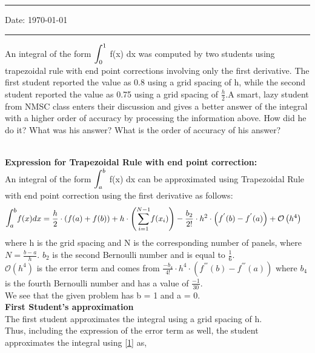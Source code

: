 \documentclass[letterpaper]{exam}
\begin{document}
\hrule
\vspace{3mm}
\noindent 
\vspace{3mm}

\noindent
{{\sf Date: \today }} %
\vspace{3mm}
\hrule
\begin{questions}
\question [3] An integral of the form $\mathlarger{\mathlarger{\int}}_0^1$ f(x) dx was computed by two students using trapezoidal rule with end point corrections involving only the first derivative. The first student reported the value as 0.8 using a grid spacing of h, while the second student reported the value as 0.75 using a grid spacing of $\frac{h}{2}$.A smart, lazy student from NMSC class enters their discussion and gives a better answer of the integral with a higher
order of accuracy by processing the information above. How did he do it? What was his answer? What is the order of accuracy of his answer?
\begin{solution}
\\
\textbf{Expression for Trapezoidal Rule with end point correction:}\\
An integral of the form $\mathlarger{\mathlarger{\int}}_a^b$ f(x) dx can be approximated using Trapezoidal Rule with end point correction using the first derivative as follows:
\begin{align}\label{1}
\mathlarger{\mathlarger{\int}}_a^b f(x) dx &= \frac{h}{2}\cdot\left(f(a) + f(b)\right) + h \cdot \left(\overset{N-1}{\underset{i=1}{\sum}} f(x_i)\right) - \frac{b_2}{2!}\cdot h^2 \cdot \left(f^{'}(b) - f^{'}(a)\right) + \mathcal{O}\left(h^4\right)
\end{align}
where h is the grid spacing and N is the corresponding number of panels, where $N = \frac{b-a}{h}$. $b_2$ is the second Bernoulli number and is equal to $\frac{1}{6}$.\\
$\mathcal{O}\left(h^4\right)$ is the error term and comes from $\frac{-b_4}{4!}\cdot h^4 \cdot \left(f^{'''}(b) - f^{'''}(a)\right)$ where $b_4$ is the fourth Bernoulli number and has a value of $\frac{-1}{30}$.\\
We see that the given problem has b = 1 and a = 0.\\
\textbf{First Student's approximation}\\
The first student approximates the integral using a grid spacing of h.\\ 
Thus, including the expression of the error term as well, the student approximates the integral using \ref{1} as,

\end{solution}
\end{questions}
\end{document}
